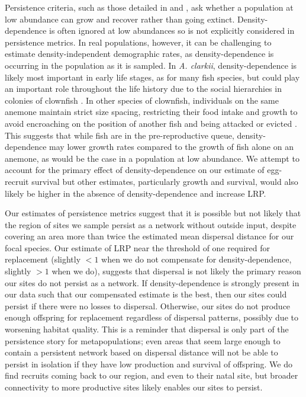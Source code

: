 \documentclass[12pt, oneside]{article}   	%
\begin{document}


Persistence criteria, such as those detailed in \cite{hastings_persistence_2006} and \cite{burgess2014beyond}, ask whether a population at low abundance can grow and recover rather than going extinct. Density-dependence is often ignored at low abundances \citep[e.g.][]{caswell_matrix_2001, hastings_simple_2006} so is not explicitly considered in persistence metrics. In real populations, however, it can be challenging to estimate density-independent demographic rates, as density-dependence is occurring in the population as it is sampled. In \textit{A. clarkii}, density-dependence is likely most important in early life stages, as for many fish species, but could play an important role throughout the life history due to the social hierarchies in colonies of clownfish \citep[e.g.][]{buston2011determinants}. In other species of clownfish, individuals on the same anemone maintain strict size spacing, restricting their food intake and growth to avoid encroaching on the position of another fish and being attacked or evicted \citep[seen in \textit{A. percula},][]{buston2003forcible, buston2003social}. This suggests that while fish are in the pre-reproductive queue, density-dependence may lower growth rates compared to the growth of fish alone on an anemone, as would be the case in a population at low abundance. We attempt to account for the primary effect of density-dependence on our estimate of egg-recruit survival but other estimates, particularly growth and survival, would also likely be higher in the absence of density-dependence and increase LRP.

Our estimates of persistence metrics suggest that it is possible but not likely that the region of sites we sample persist as a network without outside input, despite covering an area more than twice the estimated mean dispersal distance for our focal species. Our estimate of LRP near the threshold of one required for replacement (slightly $ < 1$ when we do not compensate for density-dependence, slightly $ > 1$ when we do), suggests that dispersal is not likely the primary reason our sites do not persist as a network. If density-dependence is strongly present in our data such that our compensated estimate is the best, then our sites could persist if there were no losses to dispersal. Otherwise, our sites do not produce enough offspring for replacement regardless of dispersal patterns, possibly due to worsening habitat quality. This is a reminder that dispersal is only part of the persistence story for metapopulations; even areas that seem large enough to contain a persistent network based on dispersal distance will not be able to persist in isolation if they have low production and survival of offspring. We do find recruits coming back to our region, and even to their natal site, but broader connectivity to more productive sites likely enables our sites to persist.
\end{document}
